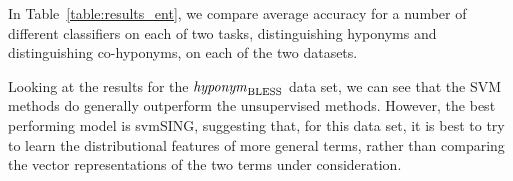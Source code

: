 \documentclass[11pt]{article}
\newcommand\entBLESS{\mbox{\em hyponym\/}_{\mbox{\scriptsize BLESS}}}
\begin{document}

In Table~\ref{table:results_ent}, we compare average accuracy for a number of different classifiers on each of two tasks, distinguishing hyponyms and distinguishing co-hyponyms, on each of the two datasets. 

Looking at the results for the $\entBLESS$ data set, we can see that the SVM methods do generally outperform the unsupervised methods.  However, the best performing model is svmSING, suggesting that, for this data set, it is best to try to learn the distributional features of more general terms, rather than comparing the vector representations of the two terms under consideration.
\end{document}
